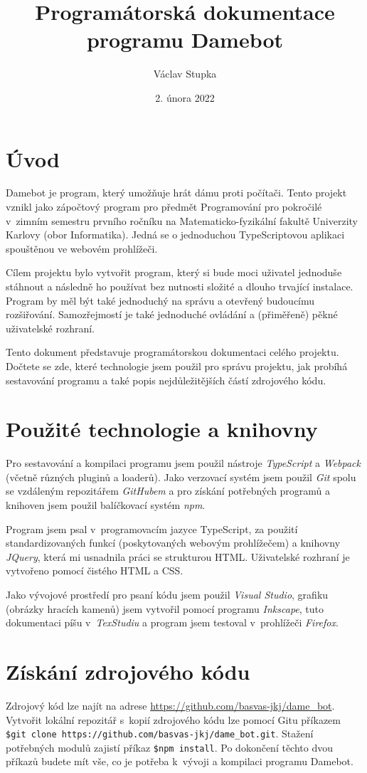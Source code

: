 \documentclass[a4paper,12pt]{article}
\title{Programátorská dokumentace programu Damebot}
\author{Václav Stupka}
\date{2. února 2022}
\begin{document}
	\maketitle
	\tableofcontents
	\section{Úvod}
	Damebot je program, který umožňuje hrát dámu proti počítači. Tento projekt vznikl jako zápočtový program
	pro předmět Programování pro pokročilé v~zimním semestru prvního ročníku na Matematicko-fyzikální fakultě Univerzity
	Karlovy (obor Informatika). Jedná se o jednoduchou TypeScriptovou aplikaci spouštěnou ve webovém prohlížeči.
	
	Cílem projektu bylo vytvořit program, který si bude moci uživatel jednoduše stáhnout a následně ho používat
	bez nutnosti složité a dlouho trvající instalace. Program by měl být také jednoduchý na správu a otevřený
	budoucímu rozšiřování. Samozřejmostí je také jednoduché ovládání a (přiměřeně) pěkné uživatelské rozhraní.
	
	Tento dokument představuje programátorskou dokumentaci celého projektu. Dočtete se zde, které technologie
	jsem použil pro správu projektu, jak probíhá sestavování programu a také popis nejdůležitějších částí
	zdrojového kódu.
	
	\section{Použité technologie a knihovny}
	Pro sestavování a kompilaci programu jsem použil nástroje \textit{TypeScript} a \textit{Webpack} (včetně různých pluginů
	a loaderů). Jako verzovací systém jsem použil \textit{Git} spolu se vzdáleným repozitářem \textit{GitHubem} a  pro
	získání potřebných programů a knihoven jsem použil balíčkovací systém \textit{npm}.
	
	Program jsem psal v~programovacím jazyce TypeScript, za použití standardizovaných funkcí (poskytovaných webovým
	prohlížečem) a knihovny \textit{JQuery}, která mi usnadnila práci se strukturou HTML. Uživatelské rozhraní je
	vytvořeno pomocí čistého HTML a CSS.
	
	Jako vývojové prostředí pro psaní kódu jsem použil \textit{Visual Studio}, grafiku (obrázky hracích kamenů) jsem vytvořil pomocí programu
	\textit{Inkscape}, tuto dokumentaci píšu v~\textit{TexStudiu} a program jsem testoval v~prohlížeči \textit{Firefox}.
	
	\section{Získání zdrojového kódu}
	Zdrojový kód lze najít na adrese \url{https://github.com/basvas-jkj/dame_bot}. Vytvořit lokální repozitář
	s~kopií zdrojového kódu lze pomocí Gitu příkazem \verb|$git clone https://github.com/basvas-jkj/dame_bot.git|.
	Stažení potřebných modulů zajistí příkaz \verb|$npm install|. Po dokončení těchto dvou příkazů budete mít vše, co je potřeba
	k~vývoji a kompilaci programu Damebot.
	
\end{document}
